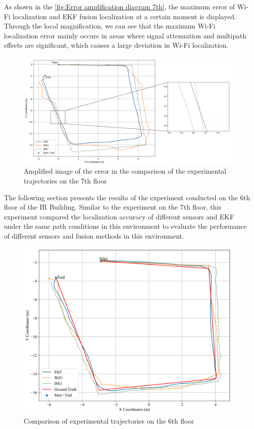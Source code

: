 \documentclass[12pt,a4paper]{article}
\numberwithin{equation}{section}
\begin{document}
\noindent As shown in the \autoref{fig:Error amplification diagram 7th}, the maximum error of Wi-Fi localization and EKF fusion localization at a certain moment is displayed. Through the local magnification, we can see that the maximum Wi-Fi localization error mainly occurs in areas where signal attenuation and multipath effects are significant, which causes a large deviation in Wi-Fi localization.
\begin{figure}[H]
    \centering
    \includegraphics[width=1\linewidth]{Amplification images/wifi/half_circle_large_diff.png}
    \caption{Amplified image of the error in the comparison of the experimental trajectories on the 7th floor}
    \label{fig:Error amplification diagram 7th}
\end{figure}
\noindent The following section presents the results of the experiment conducted on the 6th floor of the IR Building. Similar to the experiment on the 7th floor, this experiment compared the localization accuracy of different sensors and EKF under the same path conditions in this environment to evaluate the performance of different sensors and fusion methods in this environment.\\
\begin{figure}[H]
    \centering
    \includegraphics[width=0.7\linewidth]{images/1/4.png}
    \caption{Comparison of experimental trajectories on the 6th floor}
    \label{fig:Comparison of experimental trajectories on the 6th floor}
\end{figure}
\end{document}
